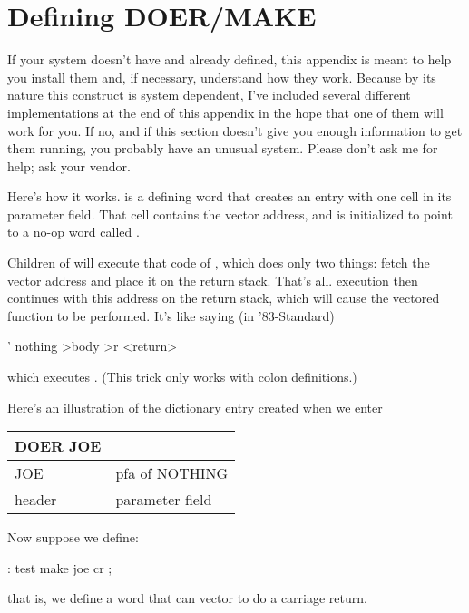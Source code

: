 \chapter{Defining
DOER/MAKE}
\initial If your system doesn't have  and 
already defined, this appendix is meant to help you install them and,
if necessary, understand how they work.  Because by its nature this
construct is system dependent, I've included several different
implementations at the end of this appendix in the hope that one of
them will work for you.  If no, and if this section doesn't give you
enough information to get them running, you probably have an unusual
system.  Please don't ask me for help; ask your \Forth{} vendor.

Here's how it works.   is a defining word that creates an
entry with one cell in its parameter field. That cell contains the vector
address, and is initialized to point to a no-op word called
.

Children of  will execute that  code of
, which does only two things:  fetch the vector address and
place it on the return stack.  That's all.  \Forth{} execution then
continues with this address on the return stack, which will cause the
vectored function to be performed.  It's like saying (in '83-Standard)
\begin{Code}
' nothing >body >r <return>
\end{Code}
which executes .  (This trick only works with colon
definitions.)

Here's an illustration of the dictionary entry created when we enter

{\sf
\bigskip
\begin{tabular}{|l|l|}
\multicolumn{1}{l}{DOER JOE} & \multicolumn{1}{l}{}\\
\hline
JOE & pfa of NOTHING \\
\hline
\multicolumn{1}{l}{header} & \multicolumn{1}{l}{parameter field}
\end{tabular}
\bigskip
}

\noindent Now suppose we define:
\begin{Code}
: test   make joe  cr ;
\end{Code}
that is, we define a word that can vector  to do a carriage
return.

